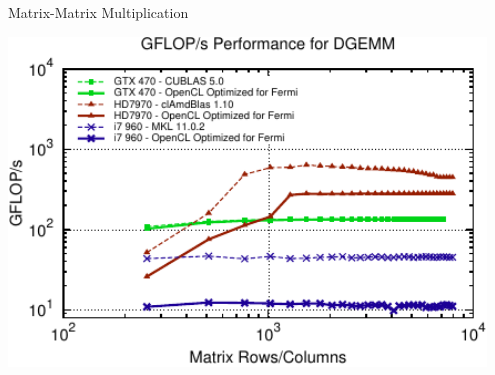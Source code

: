 \begin{frame}{Matrix-Matrix Multiplication}
  \begin{center}
   \includegraphics[width=0.95\textwidth]{figures/cross-benchmark-3-double}
  \end{center}
\end{frame}

